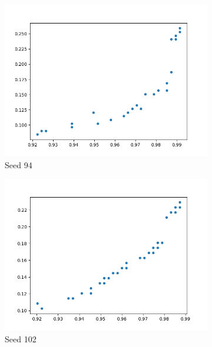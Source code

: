 \documentclass{article}
\begin{document}
\begin{figure}[h!]
	\centering
	\begin{subfigure}[b]{0.3\linewidth}
		\includegraphics[width=\linewidth]{clean1_94.png}
		\caption{Seed 94}
	\end{subfigure}
	\begin{subfigure}[b]{0.3\linewidth}
		\includegraphics[width=\linewidth]{clean1_102.png}
		\caption{Seed 102}
	\end{subfigure}
	\begin{subfigure}[b]{0.3\linewidth}

\end{subfigure}
\end{figure}
\end{document}

